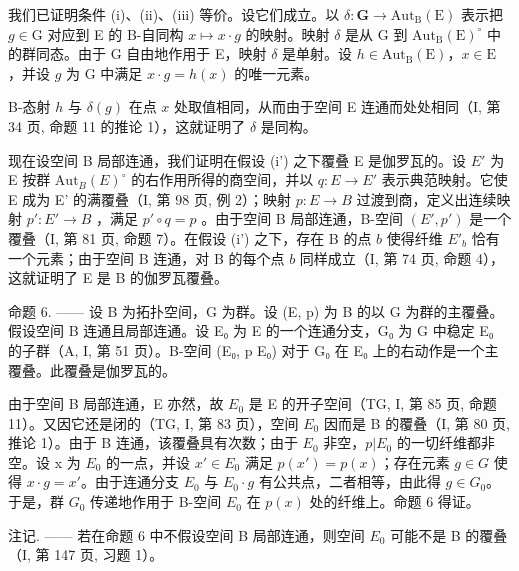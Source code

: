 我们已证明条件 (i)、(ii)、(iii) 等价。设它们成立。以 \(\delta\colon\mathbf{G}\to\mathrm{Aut}_{\mathrm{B}}(\mathrm{E})\) 表示把 \(g\in\mathrm{G}\) 对应到 E 的 B-自同构 \(x\mapsto x\cdot g\) 的映射。映射 \(\delta\) 是从 G 到 \(\mathrm{Aut}_{\mathrm{B}}(\mathrm{E})^{\circ}\) 中的群同态。由于 G 自由地作用于 E，映射 \(\delta\) 是单射。设 \(h\in\mathrm{Aut}_{\mathrm{B}}(\mathrm{E})\)，\(x\in\mathrm{E}\) ，并设 \(g\) 为 G 中满足 \(x\cdot g=h(x)\) 的唯一元素。

B-态射 \(h\) 与 \(\delta(g)\) 在点 \(x\) 处取值相同，从而由于空间 E 连通而处处相同（I, 第 34 页, 命题 11 的推论 1），这就证明了 \(\delta\) 是同构。

现在设空间 B 局部连通，我们证明在假设 (i') 之下覆叠 E 是伽罗瓦的。设 \(E'\) 为 E 按群 \(\mathrm{Aut}_{B}(E)^{\circ}\) 的右作用所得的商空间，并以 \(q\colon E \to E'\) 表示典范映射。它使 E 成为 E' 的满覆叠（I, 第 98 页, 例 2）；映射 \(p\colon E \to B\) 过渡到商，定义出连续映射 \(p'\colon E' \to B\) ，满足 \(p'\circ q = p\) 。由于空间 B 局部连通，B-空间 \((E', p')\) 是一个覆叠（I, 第 81 页, 命题 7）。在假设 (i') 之下，存在 B 的点 \(b\) 使得纤维 \(E'_{b}\) 恰有一个元素；由于空间 B 连通，对 B 的每个点 \(b\) 同样成立（I, 第 74 页, 命题 4），这就证明了 E 是 B 的伽罗瓦覆叠。

命题 6. —— 设 B 为拓扑空间，G 为群。设 (E, p) 为 B 的以 G 为群的主覆叠。假设空间 B 连通且局部连通。设 E₀ 为 E 的一个连通分支，G₀ 为 G 中稳定 E₀ 的子群（A, I, 第 51 页）。B-空间 (E₀, p \textbar{} E₀) 对于 G₀ 在 E₀ 上的右动作是一个主覆叠。此覆叠是伽罗瓦的。

由于空间 B 局部连通，E 亦然，故 \(E_{0}\) 是 E 的开子空间（TG, I, 第 85 页, 命题 11）。又因它还是闭的（TG, I, 第 83 页），空间 \(E_{0}\) 因而是 B 的覆叠（I, 第 80 页, 推论 1）。由于 B 连通，该覆叠具有次数；由于 \(E_{0}\) 非空，\(p|E_{0}\) 的一切纤维都非空。设 x 为 \(E_{0}\) 的一点，并设 \(x' \in E_{0}\) 满足 \(p(x') = p(x)\)；存在元素 \(g \in G\) 使得 \(x \cdot g = x'\)。由于连通分支 \(E_{0}\) 与 \(E_{0} \cdot g\) 有公共点，二者相等，由此得 \(g \in G_{0}\)。于是，群 \(G_{0}\) 传递地作用于 B-空间 \(E_{0}\) 在 \(p(x)\) 处的纤维上。命题 6 得证。

注记. —— 若在命题 6 中不假设空间 B 局部连通，则空间 \(E_{0}\) 可能不是 B 的覆叠（I, 第 147 页, 习题 1）。

